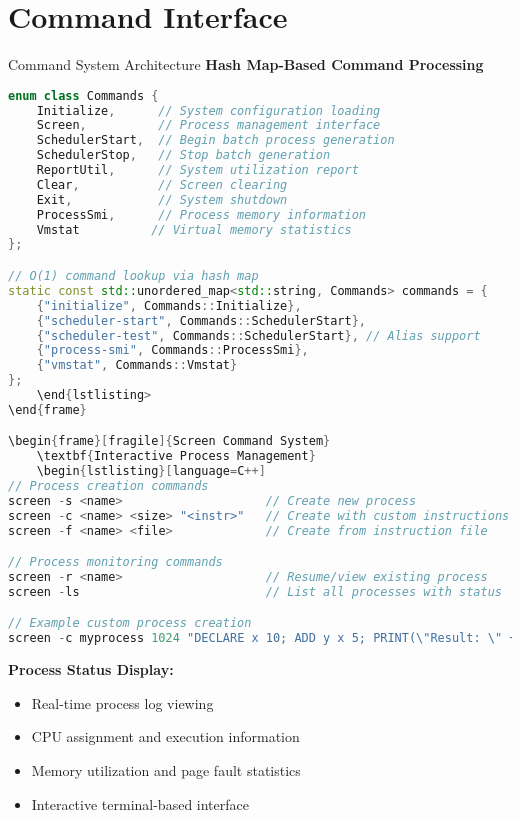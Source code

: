 \documentclass[10pt]{beamer}
\begin{document}
\section{Command Interface}

\begin{frame}[fragile]{Command System Architecture}
    \textbf{Hash Map-Based Command Processing}
    \begin{lstlisting}[language=C++]
enum class Commands {
    Initialize,      // System configuration loading
    Screen,          // Process management interface
    SchedulerStart,  // Begin batch process generation
    SchedulerStop,   // Stop batch generation
    ReportUtil,      // System utilization report
    Clear,           // Screen clearing
    Exit,            // System shutdown
    ProcessSmi,      // Process memory information
    Vmstat          // Virtual memory statistics
};

// O(1) command lookup via hash map
static const std::unordered_map<std::string, Commands> commands = {
    {"initialize", Commands::Initialize},
    {"scheduler-start", Commands::SchedulerStart},
    {"scheduler-test", Commands::SchedulerStart}, // Alias support
    {"process-smi", Commands::ProcessSmi},
    {"vmstat", Commands::Vmstat}
};
    \end{lstlisting>
\end{frame}

\begin{frame}[fragile]{Screen Command System}
    \textbf{Interactive Process Management}
    \begin{lstlisting}[language=C++]
// Process creation commands
screen -s <name>                    // Create new process
screen -c <name> <size> "<instr>"   // Create with custom instructions
screen -f <name> <file>             // Create from instruction file

// Process monitoring commands
screen -r <name>                    // Resume/view existing process
screen -ls                          // List all processes with status

// Example custom process creation
screen -c myprocess 1024 "DECLARE x 10; ADD y x 5; PRINT(\"Result: \" + y)"
    \end{lstlisting}
    
    \vspace{0.3cm}
    \textbf{Process Status Display:}
    \begin{itemize}
        \item Real-time process log viewing
        \item CPU assignment and execution information
        \item Memory utilization and page fault statistics
        \item Interactive terminal-based interface
    \end{itemize}
\end{frame}
\end{document}
